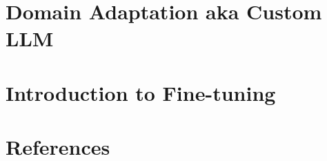 \section[DA]{Domain Adaptation aka Custom LLM}


\section[Intro]{Introduction to Fine-tuning}


\section[Refs]{References}
